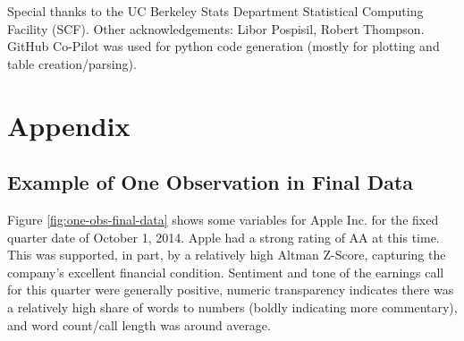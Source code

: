 \documentclass{article}[11pt]
\begin{document}
    Special thanks to the UC Berkeley Stats Department Statistical Computing Facility (SCF). Other acknowledgements: Libor Pospisil, Robert Thompson. GitHub Co-Pilot was used for python code generation (mostly for plotting and table creation/parsing).

    \clearpage
    \newpage

    
    

    \clearpage
    \newpage

    \appendix


    \section{Appendix}

    \subsection{Example of One Observation in Final Data}

    \label{sec:one-obs-final-data}

    Figure \ref{fig:one-obs-final-data} shows some variables for Apple Inc. for the fixed quarter date of October 1, 2014. Apple had a strong rating of AA at this time. This was supported, in part, by a relatively high Altman Z-Score, capturing the company's excellent financial condition. Sentiment and tone of the earnings call for this quarter were generally positive, numeric transparency indicates there was a relatively high share of words to numbers (boldly indicating more commentary), and word count/call length was around average.
\end{document}
